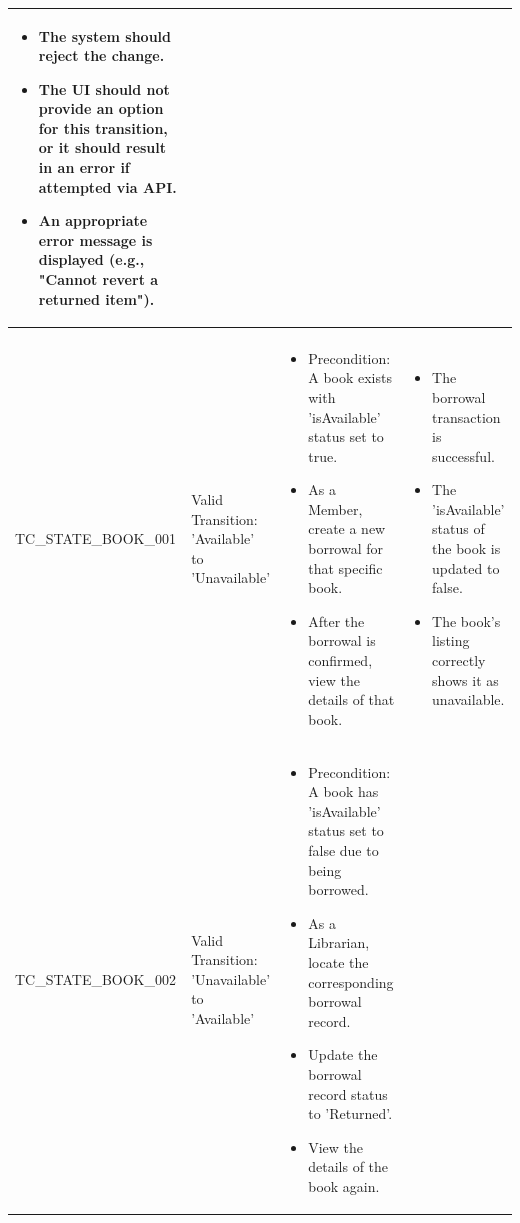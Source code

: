 \begin{longtable}{|>{\scriptsize\raggedright\arraybackslash}p{4cm}|>{\raggedright\arraybackslash}p{3cm}|>{\raggedright\arraybackslash}p{4cm}|>{\raggedright\arraybackslash}p{4cm}|}
\begin{itemize}[noitemsep, topsep=0pt, partopsep=0pt, leftmargin=*]
        \item The system should reject the change.
        \item The UI should not provide an option for this transition, or it should result in an error if attempted via API.
        \item An appropriate error message is displayed (e.g., "Cannot revert a returned item").
    \end{itemize} \\ \hline

\multicolumn{4}{|l|}{\textbf{Entity: Book (Based on 'isAvailable' attribute )}} \\ \hline
TC\_STATE\_BOOK\_001 & Valid Transition: 'Available' to 'Unavailable' & 
    \begin{itemize}[noitemsep, topsep=0pt, partopsep=0pt, leftmargin=*]
        \item Precondition: A book exists with 'isAvailable' status set to true.
        \item As a Member, create a new borrowal for that specific book. 
        \item After the borrowal is confirmed, view the details of that book. 
    \end{itemize} & 
    \begin{itemize}[noitemsep, topsep=0pt, partopsep=0pt, leftmargin=*]
        \item The borrowal transaction is successful. 
        \item The 'isAvailable' status of the book is updated to false. 
        \item The book's listing correctly shows it as unavailable.
    \end{itemize} \\ \hline
TC\_STATE\_BOOK\_002 & Valid Transition: 'Unavailable' to 'Available' & 
    \begin{itemize}[noitemsep, topsep=0pt, partopsep=0pt, leftmargin=*]
        \item Precondition: A book has 'isAvailable' status set to false due to being borrowed.
        \item As a Librarian, locate the corresponding borrowal record.
        \item Update the borrowal record status to 'Returned'. 
        \item View the details of the book again.
    \end{itemize} & 
    \begin{itemize}[noitemsep, topsep=0pt, partopsep=0pt, leftmargin=*]

\end{itemize}
\end{longtable}
